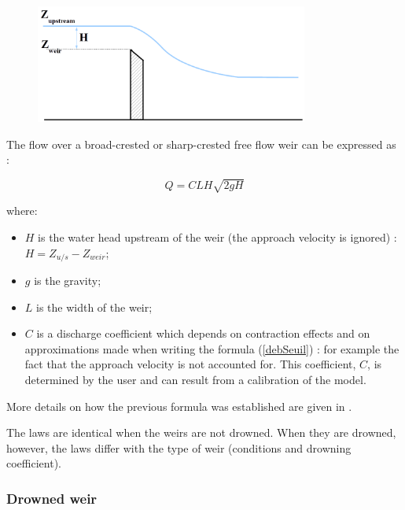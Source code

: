 \begin{figure}[H]
    \begin{center}
     \includegraphics[width=0.8\textwidth]{Figures/Sden.png}
    \end{center}
\end{figure}

The flow over a broad-crested or sharp-crested free flow weir can be expressed as :

\begin{equation}
 \label{debSeuil}
 Q = C L H \sqrt{2 g H}
\end{equation}

where:

\begin{itemize}
 \item $H$ is the water head upstream of the weir (the approach velocity is ignored) : $H = Z_{u/s} - Z_{weir}$;
 \item $g$ is the gravity;
 \item $L$ is the width of the weir;
 \item $C$ is a discharge coefficient which depends on contraction effects and on approximations made when writing the formula (\ref{debSeuil}) : for example the fact that the approach velocity is not accounted for. This coefficient, $C$, is determined by the user and can result from a calibration of the model.
\end{itemize}

More details on how the previous formula was established are given in \cite{CARLIER87}.

The laws are identical when the weirs are not drowned. When they are drowned, however, the laws differ with the type of weir (conditions and drowning coefficient).

\subsubsection{Drowned weir}

